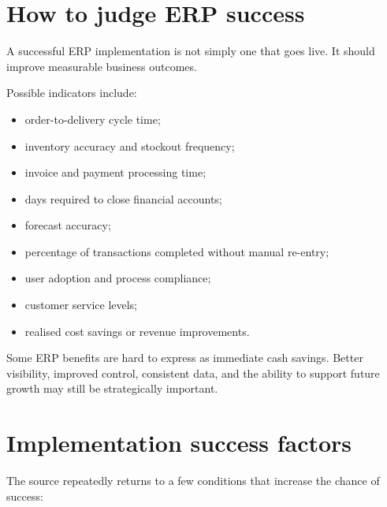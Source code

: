 \section{How to judge ERP success}

A successful ERP implementation is not simply one that goes live. It should improve measurable business outcomes.

Possible indicators include:

\begin{itemize}
  \item order-to-delivery cycle time;
  \item inventory accuracy and stockout frequency;
  \item invoice and payment processing time;
  \item days required to close financial accounts;
  \item forecast accuracy;
  \item percentage of transactions completed without manual re-entry;
  \item user adoption and process compliance;
  \item customer service levels;
  \item realised cost savings or revenue improvements.
\end{itemize}

Some ERP benefits are hard to express as immediate cash savings. Better visibility, improved control, consistent data, and the ability to support future growth may still be strategically important.

\section{Implementation success factors}

The source repeatedly returns to a few conditions that increase the chance of success:


